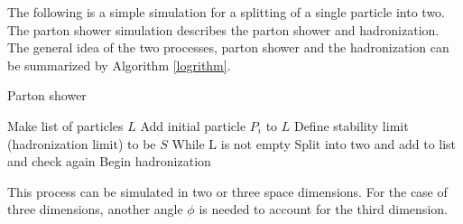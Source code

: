The following is a simple simulation for a splitting of a single particle into two. The parton shower simulation describes the parton shower and hadronization. The general idea of the two processes, parton shower and the hadronization can be summarized by Algorithm \ref{logrithm}.
\begin{algorithm}
\caption{Parton shower}\label{logrithm}
\begin{algorithmic}
\State Make list of particles $L$ 
\State Add initial particle $P_{i}$ to $L$
\State Define stability limit (hadronization limit) to be $S$  
\State While L is not empty
	\State Split into two and add to list and check again 
\Else 
	\State Begin hadronization  
\EndIf
\end{algorithmic}
\end{algorithm}

This process can be simulated in two or three space dimensions. For the case of three dimensions, another angle $\phi$ is needed to account for the third dimension.

%
%
%
%
%
%
%
%
%
%
%
